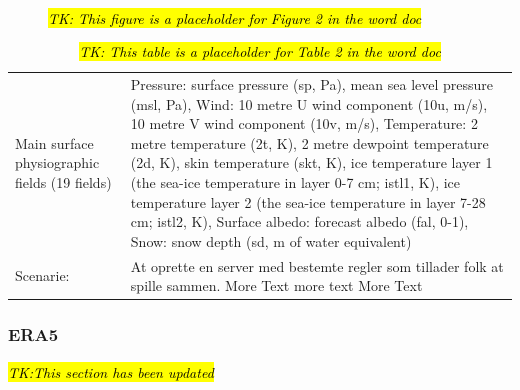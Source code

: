 \documentclass[hess, manuscript]{copernicus}
\begin{document}
\begin{figure}
	 \\
	\caption{\hl{\textit{TK: This figure is a placeholder for Figure 2 in the word doc}}} 
	\label{fig:example_figure_b}
\end{figure}


\begin{table}[h]
	\begin{tabularx}{\textwidth}{lX}
		\hline
		Main surface physiographic fields
		(19 fields)          & Pressure: surface pressure (sp, Pa), mean sea level pressure (msl, Pa), 
		Wind: 10 metre U wind component (10u, m/s), 10 metre V wind component (10v, m/s), 
		Temperature: 2 metre temperature (2t, K), 2 metre dewpoint temperature (2d, K), skin temperature (skt, K), ice temperature layer 1 (the sea-ice temperature in layer 0-7 cm; istl1, K), ice temperature layer 2 (the sea-ice temperature in layer 7-28 cm; istl2, K), 
		Surface albedo: forecast albedo (fal, 0-1), 
		Snow: snow depth (sd, m of water equivalent)
		
		\\
		Scenarie:               & At oprette en server med bestemte regler som tillader folk at spille sammen. More Text more text More Text \\
		\hline
	\end{tabularx}
\caption{\hl{\textit{TK: This table is a placeholder for Table 2 in the word doc}}}
\end{table}



\subsubsection{ERA5}
\hl{\textit{TK:This section has been updated}}
\end{document}
